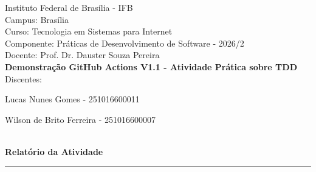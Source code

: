 \documentclass[12pt,a4paper]{article}
\begin{document}
\large{
\noindent Instituto Federal de Brasília - IFB \\
Campus: Brasília \\
Curso: Tecnologia em Sistemas para Internet \\
Componente: Práticas de Desenvolvimento de Software - 2026/2\\
Docente: Prof. Dr. Dauster Souza Pereira \\

\Large{\textbf{Demonstração GitHub Actions V1.1 - Atividade Prática sobre TDD}} \\

Discentes:

Lucas Nunes Gomes - 251016600011 

Wilson de Brito Ferreira - 251016600007 \\[0.3cm]
}\\

\Large{\textbf{Relatório da Atividade}}

\vspace{0.3cm}
\hrule
\vspace{0.5cm}


\vspace{0.5cm}



\newpage


\newpage


\newpage


\end{document}
